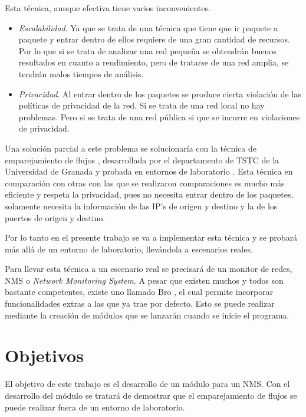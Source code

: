 \intro Esta técnica, aunque efectiva tiene varios inconvenientes.
\begin{itemize}
\item \textit{Escalabilidad}. Ya que se trata de una técnica que tiene que ir paquete a paquete y entrar dentro de ellos requiere de 
una gran cantidad de recursos. Por lo que si se trata de analizar una red pequeña se obtendrán buenos resultados en cuanto a 
rendimiento, pero de tratarse de una red amplia, se tendrán malos tiempos de análisis.
\item \textit{Privacidad}. Al entrar dentro de los paquetes se produce cierta violación de las políticas de privacidad de la red. Si 
se trata de una red local no hay problemas. Pero si se trata de una red pública si que se incurre en violaciones de privacidad.
\end{itemize}

\intro Una solución parcial a este problema se solucionaría con la técnica de emparejamiento de flujos \cite{presentacion}, 
desarrollada por el departamento de TSTC de la Universidad de Granada y probada en entornos de laboratorio \cite{comparacion}. 
Esta técnica en comparación con otras con las que se realizaron comparaciones es mucho más eficiente y respeta la privacidad, 
pues no necesita entrar dentro de los paquetes, solamente necesita la información de las IP's de origen y destino y la de los 
puertos de origen y destino.

\intro Por lo tanto en el presente trabajo se va a implementar esta técnica y se probará más allá de un entorno de laboratorio, 
llevándola a escenarios reales.

\intro Para llevar esta técnica a un escenario real se precisará de un monitor de redes, NMS o \textit{Network Monitoring System}. 
A pesar que existen muchos y todos son bastante competentes, existe uno llamado Bro \cite{broindex}, el cual permite 
incorporar funcionalidades extras a las que ya trae por defecto. Esto se puede realizar mediante la creación de módulos que se 
lanzarán cuando se inicie el programa.

\section{Objetivos}

El objetivo de este trabajo es el desarrollo de un módulo para un NMS. Con el desarrollo del módulo se tratará 
de demostrar que el emparejamiento de flujos se puede realizar fuera de un entorno de laboratorio.

